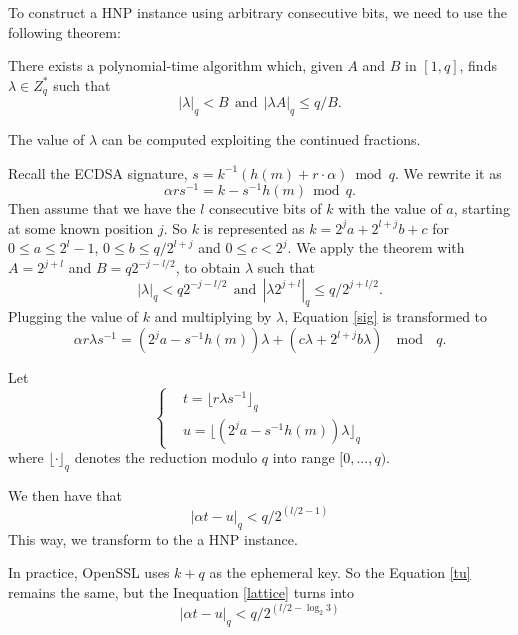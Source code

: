 To construct a HNP instance using arbitrary consecutive bits, we need to use the following theorem\cite{Nguyen2002}:
\begin{theorem}
 \label{theorem1}
There exists a polynomial-time algorithm which, given $A$ and $B$ in $[1, q]$, finds $\lambda \in Z^{*}_{q}$ such that
$$
|\lambda |_q < B  \ \  \text{and} \ \  |\lambda A|_q \leq q/B .
$$
\end{theorem}
The value of $\lambda$ can be computed exploiting the continued fractions.

Recall the ECDSA signature, $s = k^{-1} (h(m) + r\cdot\alpha) \bmod q$.
We rewrite it as
\begin{equation}
\label{sig}
\alpha rs^{-1} = k - s^{-1}h(m)  \ \  \text{mod} \ \ q.
\end{equation}
Then assume that we have the $l$ consecutive bits of $k$ with the value of $a$, starting at some known position $j$.
 So $k$ is represented as $k = 2^{j}a + 2^{l+j}b +c$ for $0 \leq a \leq 2^l -1$, $0\leq b \leq q/2^{l+j}$ and $0 \leq c < 2^j$.
 We apply the theorem with $A = 2^{j+l}$ and $B = q2^{-j-l/2}$, to obtain $\lambda$ such that
$$
|\lambda |_q < q2^{-j-l/2}  \ \  \text{and} \ \  |\lambda 2^{j+l}|_q \leq q/2^{j+l/2} .
$$
Plugging the value of $k$ and multiplying by $\lambda$, Equation \ref{sig} is transformed to
$$
\alpha r\lambda s^{-1} = (2^{j}a - s^{-1}h(m))\lambda +(c\lambda + 2^{l+j}b\lambda)  \ \  \bmod \ \ q.
$$

 Let
 \begin{equation}
 \label{tu}
 \left\{
 \begin{aligned}
 	&t = \lfloor r\lambda s^{-1} \rfloor_q    \\
 	&u = \lfloor (2^{j}a - s^{-1}h(m))\lambda \rfloor_q
 \end{aligned}
 \right.
 \end{equation}
 where $\lfloor \cdot\rfloor_q$ denotes the reduction modulo $q$ into range $[0, ..., q)$.
 
We then have that
 \begin{equation}
\label{lattice}
    |\alpha t - u|_q < q/2^{(l/2-1)}
\end{equation}
This way, we transform to the a HNP instance.

In practice, OpenSSL uses $k+q$ as the ephemeral key. So the Equation \ref{tu} remains the same, but the Inequation \ref{lattice} turns into
 \begin{equation}
\label{lattice2}
    |\alpha t - u|_q < q/2^{(l/2-\log_{2}{3})}
\end{equation}

